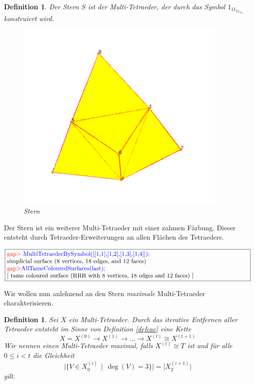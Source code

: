 \documentclass[12pt,titlepage,twoside,cleardoublepage]{article}
\theoremstyle{nummermitklammern}
\newtheorem{definition}[temp]{Definition}
\newtheorem{definition}[zahl]{Definition}
\numberwithin{equation}{section}
\begin{document}
\begin{definition}
Der \emph{Stern} $S$ ist der Multi-Tetraeder, der durch das Symbol $1_11_21_31_4$ konstruiert wird.
\begin{figure}[H]
\begin{center}
\includegraphics[scale=0.7,viewport=0cm 2.5cm 8cm 8cm]{star}
\end{center}
\caption{Stern}
\end{figure}
\end{definition}
Der Stern ist ein weiterer Multi-Tetraeder mit einer zahmen Färbung. Dieser entsteht durch Tetraeder-Erweiterungen an allen Flächen des Tetraeders. 
\begin{center}
$\fbox{\parbox{14cm}{
\textcolor{red}{gap$>$} \textcolor{blue}{MultiTetraederBySymbol([[1,1],[1,2],[1,3],[1,4]]);}\newline
simplicial surface (8 vertices, 18 edges, and 12 faces)\newline
\textcolor{red}{gap$>$}\textcolor{blue}{ AllTameColouredSurfaces(last);}\newline
[ tame coloured surface (RRR with 8 vertices, 18 edges and 12 faces)
 ]
}}$
\end{center}
Wir wollen nun anlehnend an den Stern \emph{maximale} Multi-Tetraeder charakterisieren.
\begin{definition}
Sei $X$ ein Multi-Tetraeder. Durch das iterative Entfernen aller Tetraeder entsteht im Sinne von Definition \ref{defcac} eine Kette 
\[
X=X^{(0)}\to X^{(1)}\to \ldots \to X^{(t)}\cong X^{(t+1)}
\]
Wir nennen einen Multi-Tetraeder \emph{maximal}, falls $X^{(t)}\cong T$ ist und für alle $0\leq i< t$ die Gleichheit
\[
\vert \{V\in X_0^{(i)}\,\mid \, \deg(V)=3\}\vert=\vert X^{(i+1)}_2\vert 
\]
gilt.
\end{definition}
\end{document}
